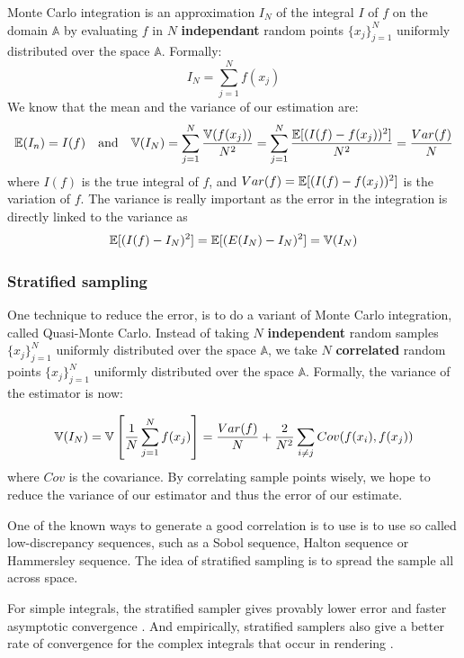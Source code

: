 \documentclass{classeENS}
\begin{document}
Monte Carlo integration is an approximation $I_N$ of the integral 
$I$ of $f$ on the domain $\mathbb A$ by evaluating $f$ in $N$ \textbf{independant} 
random points $\{x_j\}_{j=1}^N$ uniformly distributed over the 
space $\mathbb A$. Formally:
\begin{equation}
    \label{eq:montecarlo}
    I_N = \sum_{j=1}^N f(x_j)
\end{equation}
We know that the mean and the variance of our estimation are:
\begin{equation}
    \mathbb E(I_n) = I(f) \quad \text{and} \quad 
    \mathbb V(I_N) = \sum_{j=1}^N \frac{\mathbb V(f(x_j))}{N^2} = \sum_{j=1}^N\frac{\mathbb E[(I(f) - f(x_j))^2]}{N^2} = \frac{Var(f)}{N}
\end{equation}
where $I(f)$ is the true integral of $f$, and $Var(f)=\mathbb E[(I(f) - f(x_j))^2]$ is the variation of $f$. 
The variance is really important as the error in the integration is directly 
linked to the variance as
\begin{align*}   \label{eq:variance}
    \mathbb E[(I(f) - I_N)^2] = \mathbb E[(E(I_N) - I_N)^2] = \mathbb V(I_N)
\end{align*}

\subsubsection{Stratified sampling}

One technique to reduce the error, is to do a variant of Monte Carlo integration, 
called Quasi-Monte Carlo. Instead of taking $N$ \textbf{independent} random samples 
$\{x_j\}_{j=1}^N$ 
uniformly distributed over the space $\mathbb A$, we take $N$ \textbf{correlated} random 
points $\{x_j\}_{j=1}^N$ uniformly distributed over the space $\mathbb A$. Formally, 
the variance of the estimator is now:
 
\[ \mathbb V(I_N) = \mathbb V\left [\frac{1}{N}\sum_{j=1}^N f(x_j) \right ] = \frac{Var(f)}{N} + \frac{2}{N^2}\sum_{i\neq j} Cov(f(x_i),f(x_j)) \]
where $Cov$ is the covariance.
By correlating sample points wisely, we hope to reduce the variance of our estimator and 
thus the error of our estimate. 

\par One of the known ways to generate a good correlation is to use is to 
use so called low-discrepancy sequences, 
such as a Sobol sequence, Halton sequence or Hammersley sequence. The 
idea of stratified sampling is to spread the sample all across space.

For simple integrals, the stratified sampler gives provably lower error and 
faster asymptotic convergence \cite{10.1145/237170.237265}. And empirically, 
stratified samplers also give a better rate of convergence for the complex 
integrals that occur in rendering \cite{renderman}.
\end{document}
